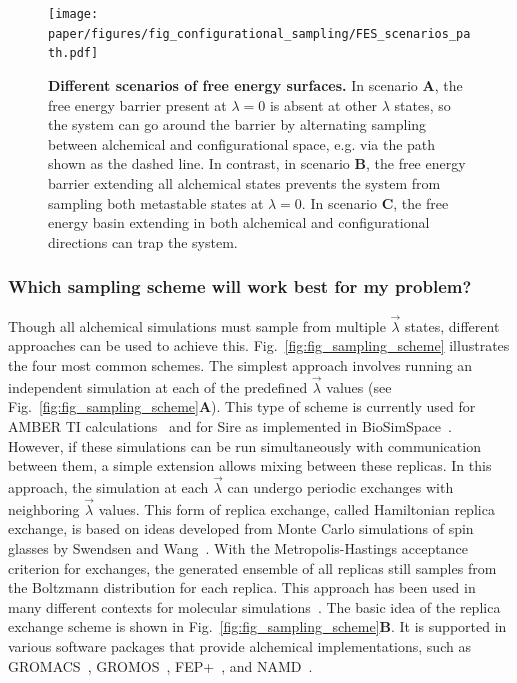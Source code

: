 \documentclass[9pt,bestpractices]{livecoms}
\begin{document}
\begin{figure}
    \texttt{[image: paper/figures/fig\_configurational\_sampling/FES\_scenarios\_path.pdf]}
    \caption{\textbf{Different scenarios of free energy surfaces.} In scenario \textbf{A}, the free energy barrier present at $\lambda=0$ is absent at other $\lambda$ states, so the system can go around the barrier by alternating sampling between alchemical and configurational space, e.g. via the path shown as the dashed line. In contrast, in scenario \textbf{B}, the free energy barrier extending all alchemical states prevents the system from sampling both metastable states at $\lambda=0$. In scenario \textbf{C}, the free energy basin extending in both alchemical and configurational directions can trap the system.}
    \label{fig:configurational_sampling}
\end{figure} 


\subsubsection{Which sampling scheme will work best for my problem?}
\label{sec:sampling_schemes}
Though all alchemical simulations must sample from multiple $\vec{\lambda}$ states, different approaches can be used to achieve this. Fig.~\ref{fig:fig_sampling_scheme} illustrates the four most common schemes. The simplest approach involves running an independent simulation at each of the predefined $\vec{\lambda}$ values (see Fig.~\ref{fig:fig_sampling_scheme}\textbf{A}). This type of scheme is currently used for AMBER TI calculations~\cite{song2019using} and for Sire as implemented in BioSimSpace~\cite{hedges2019biosimspace}. However, if these simulations can be run simultaneously with communication between them, a simple extension allows mixing between these replicas. In this approach, the simulation at each $\vec{\lambda}$ can undergo periodic exchanges with neighboring $\vec{\lambda}$ values. This form of replica exchange, called Hamiltonian replica exchange, is based on ideas developed from Monte Carlo simulations of spin glasses by Swendsen and Wang~\cite{swendsen1986replica}. With the Metropolis-Hastings acceptance criterion for exchanges, the generated ensemble of all replicas still samples from the Boltzmann distribution for each replica. This approach has been used in many different contexts for molecular simulations~\cite{sugita2000multidimensional,sugita1999replicaexchange, woods2003development, jiang2010free}. The basic idea of the replica exchange scheme is shown in Fig.~\ref{fig:fig_sampling_scheme}\textbf{B}. It is supported in various software packages that provide alchemical implementations, such as GROMACS~\cite{aldeghi2015accurate}, GROMOS~\cite{hritz2008hamiltonian,hritz2007optimization}, FEP+~\cite{wang2015accurate}, and NAMD~\cite{jiang2019computing}. 
\end{document}
